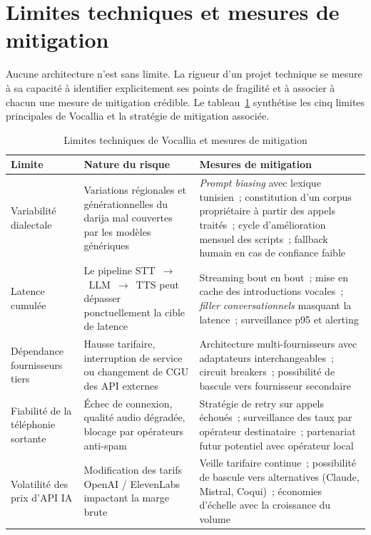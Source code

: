 \section{Limites techniques et mesures de mitigation}
\label{sec:limites_mitigation}

Aucune architecture n'est sans limite. La rigueur d'un projet technique se mesure à sa capacité à identifier explicitement ses points de fragilité et à associer à chacun une mesure de mitigation crédible. Le tableau~\ref{tab:limites_mitigation} synthétise les cinq limites principales de Vocallia et la stratégie de mitigation associée.

\begin{table}[H]
\centering
\caption{Limites techniques de Vocallia et mesures de mitigation}
\label{tab:limites_mitigation}
\begin{tabular}{|p{3.5cm}|p{4.5cm}|p{6cm}|}
\hline
\textbf{Limite} & \textbf{Nature du risque} & \textbf{Mesures de mitigation} \\
\hline
Variabilité dialectale & Variations régionales et générationnelles du darija mal couvertes par les modèles génériques & \emph{Prompt biasing} avec lexique tunisien~; constitution d'un corpus propriétaire à partir des appels traités~; cycle d'amélioration mensuel des scripts~; fallback humain en cas de confiance faible \\
\hline
Latence cumulée & Le pipeline STT~$\to$~LLM~$\to$~TTS peut dépasser ponctuellement la cible de latence & Streaming bout en bout~; mise en cache des introductions vocales~; \emph{filler conversationnels} masquant la latence~; surveillance p95 et alerting \\
\hline
Dépendance fournisseurs tiers & Hausse tarifaire, interruption de service ou changement de CGU des API externes & Architecture multi-fournisseurs avec adaptateurs interchangeables~; circuit breakers~; possibilité de bascule vers fournisseur secondaire \\
\hline
Fiabilité de la téléphonie sortante & Échec de connexion, qualité audio dégradée, blocage par opérateurs anti-spam & Stratégie de retry sur appels échoués~; surveillance des taux par opérateur destinataire~; partenariat futur potentiel avec opérateur local \\
\hline
Volatilité des prix d'API IA & Modification des tarifs OpenAI / ElevenLabs impactant la marge brute & Veille tarifaire continue~; possibilité de bascule vers alternatives (Claude, Mistral, Coqui)~; économies d'échelle avec la croissance du volume \\
\hline
\end{tabular}
\end{table}

